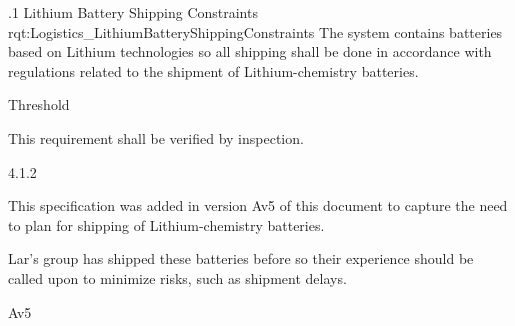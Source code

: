 \ONERQMTV
{\RqtNumberBase.1}
{Lithium Battery Shipping Constraints}
{rqt:Logistics_LithiumBatteryShippingConstraints}
{The system contains batteries based on Lithium technologies so all shipping shall be done in accordance with regulations related to the shipment of Lithium-chemistry batteries.}
{
	\item [Phase 1] Threshold
}
{This requirement shall be verified by inspection.}
{
	\item [\TBD] 4.1.2
}
{
	\item This specification was added in version Av5 of this document to capture the need to plan for shipping of Lithium-chemistry batteries.
	\item Lar's group has shipped these batteries before so their experience should be called upon to minimize risks, such as shipment delays.
}
{Av5}

